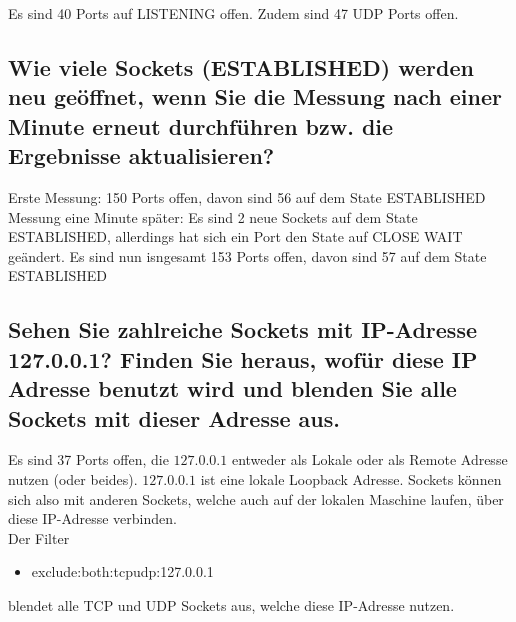 \documentclass{kdiartcl}
\begin{document}
Es sind 40 Ports auf LISTENING offen. Zudem sind 47 UDP Ports offen.

\subsection{Wie viele Sockets (ESTABLISHED) werden neu geöffnet, wenn Sie die Messung nach einer Minute
erneut durchführen bzw. die Ergebnisse aktualisieren?}
Erste Messung: 150 Ports offen, davon sind 56 auf dem State ESTABLISHED \\
Messung eine Minute später: Es sind 2 neue Sockets auf dem State ESTABLISHED, allerdings hat sich ein Port den State auf CLOSE WAIT geändert. Es sind nun isngesamt 153 Ports offen, davon sind 57 auf dem State ESTABLISHED

\subsection{Sehen Sie zahlreiche Sockets mit IP-Adresse 127.0.0.1? Finden Sie heraus, wofür diese IP Adresse
benutzt wird und blenden Sie alle Sockets mit dieser Adresse aus.}
Es sind 37 Ports offen, die $127.0.0.1$ entweder als Lokale oder als Remote Adresse nutzen (oder beides). $127.0.0.1$ ist eine lokale Loopback Adresse. Sockets können sich also mit anderen Sockets, welche auch auf der lokalen Maschine laufen, über diese IP-Adresse verbinden.\\
Der Filter 
\begin{itemize}
    \item exclude:both:tcpudp:127.0.0.1
\end{itemize}
blendet alle TCP und UDP Sockets aus, welche diese IP-Adresse nutzen.
\end{document}
